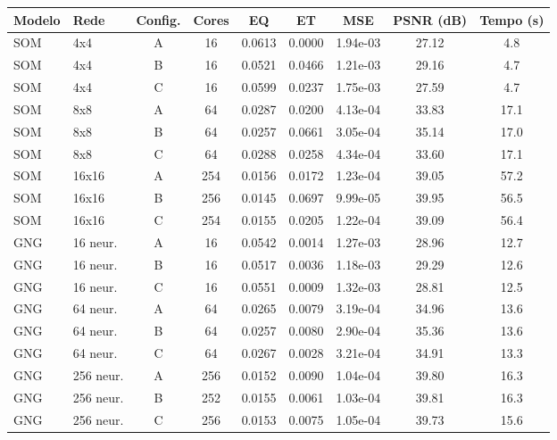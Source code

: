 \begin{tabular}{llccccccc}
\toprule
Modelo & Rede & Config. & Cores & EQ & ET & MSE & PSNR (dB) & Tempo (s)\\
\midrule
SOM & 4x4 & A & 16 & 0.0613 & 0.0000 & 1.94e-03 & 27.12 & 4.8\\
SOM & 4x4 & B & 16 & 0.0521 & 0.0466 & 1.21e-03 & 29.16 & 4.7\\
SOM & 4x4 & C & 16 & 0.0599 & 0.0237 & 1.75e-03 & 27.59 & 4.7\\
\midrule
SOM & 8x8 & A & 64 & 0.0287 & 0.0200 & 4.13e-04 & 33.83 & 17.1\\
SOM & 8x8 & B & 64 & 0.0257 & 0.0661 & 3.05e-04 & 35.14 & 17.0\\
SOM & 8x8 & C & 64 & 0.0288 & 0.0258 & 4.34e-04 & 33.60 & 17.1\\
\midrule
SOM & 16x16 & A & 254 & 0.0156 & 0.0172 & 1.23e-04 & 39.05 & 57.2\\
SOM & 16x16 & B & 256 & 0.0145 & 0.0697 & 9.99e-05 & 39.95 & 56.5\\
SOM & 16x16 & C & 254 & 0.0155 & 0.0205 & 1.22e-04 & 39.09 & 56.4\\
\midrule
GNG & 16 neur. & A & 16 & 0.0542 & 0.0014 & 1.27e-03 & 28.96 & 12.7\\
GNG & 16 neur. & B & 16 & 0.0517 & 0.0036 & 1.18e-03 & 29.29 & 12.6\\
GNG & 16 neur. & C & 16 & 0.0551 & 0.0009 & 1.32e-03 & 28.81 & 12.5\\
\midrule
GNG & 64 neur. & A & 64 & 0.0265 & 0.0079 & 3.19e-04 & 34.96 & 13.6\\
GNG & 64 neur. & B & 64 & 0.0257 & 0.0080 & 2.90e-04 & 35.36 & 13.6\\
GNG & 64 neur. & C & 64 & 0.0267 & 0.0028 & 3.21e-04 & 34.91 & 13.3\\
\midrule
GNG & 256 neur. & A & 256 & 0.0152 & 0.0090 & 1.04e-04 & 39.80 & 16.3\\
GNG & 256 neur. & B & 252 & 0.0155 & 0.0061 & 1.03e-04 & 39.81 & 16.3\\
GNG & 256 neur. & C & 256 & 0.0153 & 0.0075 & 1.05e-04 & 39.73 & 15.6\\
\bottomrule
\end{tabular}
